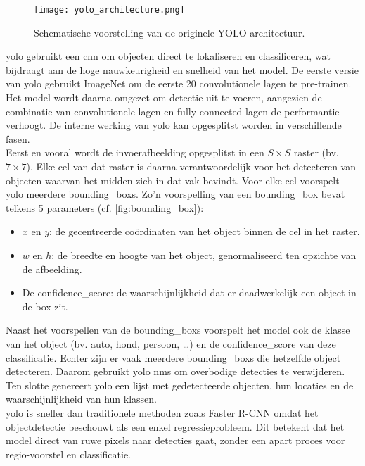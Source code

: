\begin{figure}[H]
    \centering
    \texttt{[image: yolo\_architecture.png]}
    \caption[Originele YOLO-architectuur.]{\label{fig:yolo_architecture}Schematische voorstelling van de originele YOLO-architectuur. \autocite{Redmon_2016}}
\end{figure}

\gls{yolo} gebruikt een \gls{cnn} om objecten direct te lokaliseren en classificeren, wat bijdraagt aan de hoge nauwkeurigheid en snelheid van het model. De eerste versie van \gls{yolo} gebruikt ImageNet om de eerste 20 convolutionele lagen te pre-trainen. Het model wordt daarna omgezet om detectie uit te voeren, aangezien de combinatie van convolutionele lagen en fully-connected-lagen de performantie verhoogt. \autocite{Redmon_2016} De interne werking van \gls{yolo} kan opgesplitst worden in verschillende fasen. \\

Eerst en vooral wordt de invoerafbeelding opgesplitst in een $S \times S$ raster (bv. $7 \times 7$). Elke cel van dat raster is daarna verantwoordelijk voor het detecteren van objecten waarvan het midden zich in dat vak bevindt. Voor elke cel voorspelt \gls{yolo} meerdere \glspl{bounding_box}. Zo'n voorspelling van een \gls{bounding_box} bevat telkens 5 parameters (cf. \ref{fig:bounding_box}): 

\begin{itemize}
    \item $x$ en $y$: de gecentreerde coördinaten van het object binnen de cel in het raster.
    \item $w$ en $h$: de breedte en hoogte van het object, genormaliseerd ten opzichte van de afbeelding.
    \item De \gls{confidence_score}: de waarschijnlijkheid dat er daadwerkelijk een object in de box zit.
\end{itemize}

Naast het voorspellen van de \glspl{bounding_box} voorspelt het model ook de klasse van het object (bv. auto, hond, persoon, \dots) en de \gls{confidence_score} van deze classificatie. Echter zijn er vaak meerdere \glspl{bounding_box} die hetzelfde object detecteren. Daarom gebruikt \gls{yolo} \gls{nms} om overbodige detecties te verwijderen. Ten slotte genereert \gls{yolo} een lijst met gedetecteerde objecten, hun locaties en de waarschijnlijkheid van hun klassen. \autocite{Diwan_2022} \\

\gls{yolo} is sneller dan traditionele methoden zoals Faster R-CNN omdat het objectdetectie beschouwt als een enkel regressieprobleem. Dit betekent dat het model direct van ruwe pixels naar detecties gaat, zonder een apart proces voor regio-voorstel en classificatie. \\

